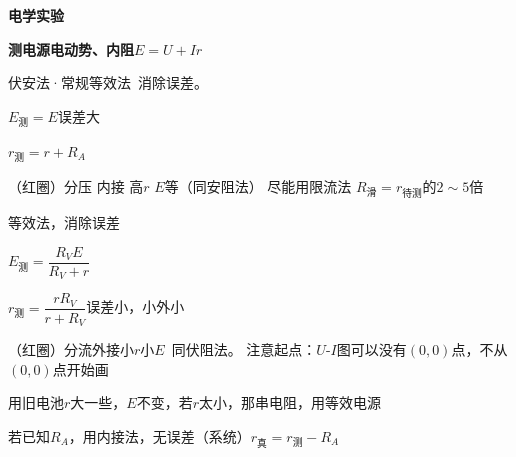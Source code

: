 \textbf{电学实验}

\textbf{测电源电动势、内阻}\qquad $E=U+Ir$

伏安法·常规\qquad 等效法\ 消除误差。

\begin{minipage}[t]{0.50\linewidth}
\end{minipage}\hfill
\begin{minipage}[t]{0.46\linewidth}
\end{minipage}

$E_{\text{测}}=E$\qquad 误差大 

$r_{\text{测}}=r+R_A$

（红圈）分压 内接 高$r$ $E$等（同安阻法）
尽能用限流法 %
\quad $R_{\text{滑}}=r_{\text{待测}}$的$2\sim5$倍

\begin{minipage}[t]{0.50\linewidth}
\end{minipage}\hfill
\begin{minipage}[t]{0.46\linewidth}
\end{minipage}

等效法，消除误差

$E_{\text{测}}=\dfrac{R_VE}{R_V+r}$

$r_{\text{测}}=\dfrac{rR_V}{r+R_V}$\qquad 误差小，小外小

（红圈）分流外接小$r$小$E$\ 同伏阻法。
注意起点：$U$-$I$图可以没有$(0,0)$点，不从$(0,0)$点开始画

用旧电池$r$大一些，$E$不变，若$r$太小，那串电阻，用等效电源

若已知$R_A$，用内接法，无误差（系统）\qquad $r_{\text{真}}=r_{\text{测}}-R_A$


